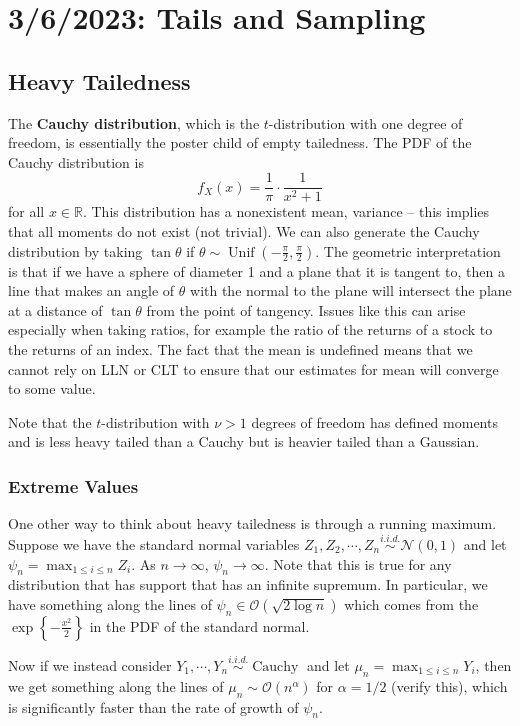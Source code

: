 \chapter{3/6/2023: Tails and Sampling}
\section{Heavy Tailedness}
The \textbf{Cauchy distribution}, which is the $t$-distribution with one degree of freedom, is essentially the poster child of empty tailedness. The PDF of the Cauchy distribution is $$f_X(x) = \frac{1}{\pi}\cdot\frac{1}{x^2+1}$$ for all $x\in\mathbb R$. This distribution has a nonexistent mean, variance -- this implies that all moments do not exist (not trivial). We can also generate the Cauchy distribution by taking $\tan\theta$ if $\theta\sim\operatorname{Unif}\left(-\frac{\pi}{2},\frac{\pi}{2}\right)$. The geometric interpretation is that if we have a sphere of diameter 1 and a plane that it is tangent to, then a line that makes an angle of $\theta$ with the normal to the plane will intersect the plane at a distance of $\tan\theta$ from the point of tangency. Issues like this can arise especially when taking ratios, for example the ratio of the returns of a stock to the returns of an index. The fact that the mean is undefined means that we cannot rely on LLN or CLT to ensure that our estimates for mean will converge to some value.

Note that the $t$-distribution with $\nu>1$ degrees of freedom has defined moments and is less heavy tailed than a Cauchy but is heavier tailed than a Gaussian.

\subsection{Extreme Values}
One other way to think about heavy tailedness is through a running maximum. Suppose we have the standard normal variables $Z_1,Z_2,\cdots,Z_n\overset{i.i.d.}{\sim}\mathcal N(0,1)$ and let $\psi_n=\max_{1\leq i\leq n} Z_i$. As $n\to\infty$, $\psi_n\to\infty$. Note that this is true for any distribution that has support that has an infinite supremum. In particular, we have something along the lines of $\psi_n\in\mathcal O(\sqrt{2\log n})$ which comes from the $\exp\left\{-\frac{x^2}{2}\right\}$ in the PDF of the standard normal.

Now if we instead consider $Y_1,\cdots,Y_n\overset{i.i.d.}{\sim}\operatorname{Cauchy}$ and let $\mu_n=\max_{1\leq i\leq n} Y_i$, then we get something along the lines of $\mu_n\sim\mathcal O(n^\alpha)$ for $\alpha=1/2$ (verify this), which is significantly faster than the rate of growth of $\psi_n$.

